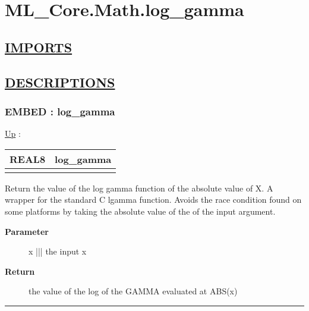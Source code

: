 \chapter*{ML\_Core.Math.log\_gamma}
\hypertarget{ecldoc:toc:ML_Core.Math.log_gamma}{}

\section*{\underline{IMPORTS}}

\section*{\underline{DESCRIPTIONS}}
\subsection*{EMBED : log\_gamma}
\hypertarget{ecldoc:ml_core.math.log_gamma}{}
\hyperlink{ecldoc:toc:ML_Core/Math}{Up} :

{\renewcommand{\arraystretch}{1.5}
\begin{tabularx}{\textwidth}{|>{\raggedright\arraybackslash}l|X|}
\hline
\hspace{0pt}REAL8 & log\_gamma \\
\hline
\multicolumn{2}{|>{\raggedright\arraybackslash}X|}{\hspace{0pt}(REAL8 x)} \\
\hline
\end{tabularx}
}

\par
Return the value of the log gamma function of the absolute value of X. A wrapper for the standard C lgamma function. Avoids the race condition found on some platforms by taking the absolute value of the of the input argument.

\par
\begin{description}
\item [\textbf{Parameter}] x ||| the input x
\item [\textbf{Return}] the value of the log of the GAMMA evaluated at ABS(x)
\end{description}

\rule{\linewidth}{0.5pt}
